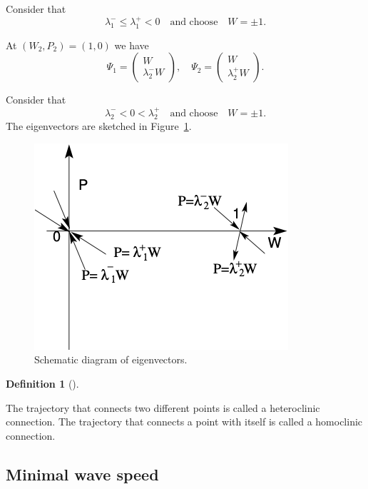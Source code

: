 \documentclass[
  letterpaper,
  DIV=11,
  numbers=noendperiod]{scrreprt}
\theoremstyle{plain}
\theoremstyle{definition}
\newtheorem{definition}{Definition}[chapter]
\theoremstyle{plain}
\theoremstyle{remark}
\begin{document}
Consider that \[
\lambda_1^- \leq \lambda_1^+ <0 \quad \textrm{and choose} \quad W = \pm 1.
\]

At \((W_2, P_2)=(1,0)\) we have \[
\Psi_1 = \begin{pmatrix}
W\\
\lambda_2^- W
\end{pmatrix}, \quad  \Psi_2 = \begin{pmatrix}
W\\
\lambda_2^+ W
\end{pmatrix}.
\]

Consider that \[
\lambda_2^- <0 < \lambda_2^+  \quad \textrm{and choose} \quad W = \pm 1.
\] The eigenvectors are sketched in Figure~\ref{fig-eigenvectors}.

\begin{figure}

{\centering \includegraphics{fig_4.png}

}

\caption{\label{fig-eigenvectors}Schematic diagram of eigenvectors.}

\end{figure}

\begin{definition}[]\protect\hypertarget{def-line}{}\label{def-line}

The trajectory that connects two different points is called a
heteroclinic connection. The trajectory that connects a point with
itself is called a homoclinic connection.

\end{definition}

\hypertarget{minimal-wave-speed}{%
\subsection{Minimal wave speed}\label{minimal-wave-speed}}
\end{document}

